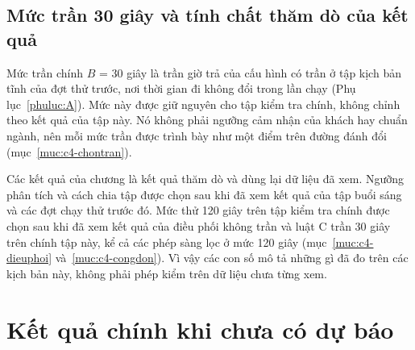 
\subsection{Mức trần 30 giây và tính chất thăm dò của kết quả}
\label{muc:c4-thamdo}

Mức trần chính $B$ = 30 giây là trần giờ trả của cấu hình có trần ở tập kịch bản tĩnh của đợt thử trước, nơi thời
gian đi không đổi trong lần chạy (Phụ lục~\ref{phuluc:A}). Mức này được giữ nguyên cho tập kiểm tra chính, không chỉnh
theo kết quả của tập này. Nó không phải ngưỡng cảm nhận của khách hay chuẩn ngành, nên mỗi mức trần được trình bày
như một điểm trên đường đánh đổi (mục~\ref{muc:c4-chontran}).

Các kết quả của chương là kết quả thăm dò và dùng lại dữ liệu đã xem. Ngưỡng phân tích và cách chia tập được chọn
sau khi đã xem kết quả của tập buổi sáng và các đợt chạy thử trước đó. Mức thử 120 giây trên tập kiểm tra chính được
chọn sau khi đã xem kết quả của điều phối không trần và luật C trần 30 giây trên chính tập này, kể cả các phép sàng
lọc ở mức 120 giây (mục~\ref{muc:c4-dieuphoi} và~\ref{muc:c4-congdon}). Vì vậy các con số mô tả những gì đã đo trên
các kịch bản này, không phải phép kiểm trên dữ liệu chưa từng xem.

\section{Kết quả chính khi chưa có dự báo}
\label{muc:c4-ketqua}

